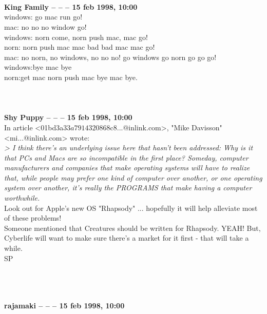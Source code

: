 \documentclass[11pt,twoside,a4paper]{article}
\begin{document}
\begin{multicols*}{2}
 
		
	
		
~\\ ~\\ ~\\ \textbf{King Family -- -- -- 15 feb 1998, 10:00}~\\

windows: go mac run go!~\\
mac: no no no window go!~\\
windows: norn come, norn push mac, mac go!~\\
norn: norn push mac mac bad bad mac mac go!~\\
mac: no norn, no windows, no no no!  go windows go norn go go go!~\\
windows:bye mac bye~\\
norn:get mac norn push mac bye mac bye.~\\

 
		
	
		
~\\ ~\\ ~\\ \textbf{Shy Puppy -- -- -- 15 feb 1998, 10:00}~\\

In article <01bd3a33$a7914320$868c8...@inlink.com>, "Mike Davisson" <mi...@inlink.com> wrote:~\\
\emph{> I think there's an underlying issue here that hasn't been addressed: Why is it that PCs and Macs are so incompatible in the first place? Someday, computer manufacturers and companies that make operating systems will have to realize that, while people may prefer one kind of computer over another, or one operating system over another, it's really the PROGRAMS that make having a computer worthwhile. }~\\

Look out for Apple's new OS "Rhapsody" ...   hopefully it will help alleviate most of these problems!~\\

Someone mentioned that Creatures should be written for Rhapsody.  YEAH! But, Cyberlife will want to make sure there's a market for it first - that will take a while.~\\

SP

 
		
	
		
~\\ ~\\ ~\\ \textbf{rajamaki -- -- -- 15 feb 1998, 10:00}~\\


\end{multicols*}
\end{document}
